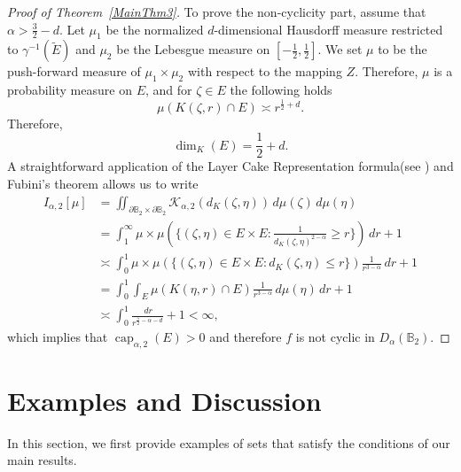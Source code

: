\documentclass[a4paper,12pt]{amsart}
\theoremstyle{definition}
\theoremstyle{remark}
\def\B{\mathbb{B}}
\begin{document}
\begin{proof} [Proof of Theorem~\ref{MainThm3}]
    To prove the non-cyclicity part, assume that $\alpha > \frac{3}{2} - d$. Let $\mu_1$ be the normalized $d$-dimensional Hausdorff measure restricted to $\gamma^{-1}(\tilde{E})$ and $\mu_2$ be the Lebesgue measure on $[-\frac{1}{2}, \frac{1}{2}]$. We set $\mu$ to be the push-forward measure of $\mu_1 \times \mu_2$ with respect to the mapping $Z$. Therefore, $\mu$ is a probability measure on $E$, and for $\zeta \in E$ the following holds
    \begin{equation*}
        \mu (K(\zeta,r) \cap E) \asymp r^{\frac{1}{2}+d}.
    \end{equation*}
    Therefore,
    \begin{equation*}
        \dim_{K}(E) = \frac{1}{2} + d.
    \end{equation*}
    A straightforward application of the Layer Cake Representation formula(see \cite[p.~26]{LiebLoss}) and Fubini's theorem allows us to write
    \begin{equation*}
    \begin{aligned}
        I_{\alpha,2}[\mu] & = \iint_{\mathbb \partial \B_2 \times \partial \B_2} \mathcal{K}_{\alpha,2}\!\left( d_K(\zeta,\eta) \right) \, d\mu(\zeta)\, d\mu(\eta) \\
        & = \int_{1}^\infty \mu \times \mu (\{ (\zeta,\eta) \in E \times E : \frac{1}{d_K(\zeta,\eta)^{2-\alpha} } \geq r \} ) \, dr + 1 \\
        & \asymp \int_{0}^1 \mu \times \mu (\{ (\zeta,\eta) \in E \times E : d_K(\zeta,\eta)  \leq r \}) \frac{1}{r^{3-\alpha}} \, dr +1 \\
        & = \int_{0}^1 \int_{E} \mu (K(\eta,r)\cap E) \frac{1}{r^{3-\alpha}} \,d\mu(\eta) \, dr +1 \\
        & \asymp \int_{0}^1 \frac{\, dr}{r^{\frac{5}{2}-\alpha - d}} + 1 < \infty,
    \end{aligned}
    \end{equation*}
    which implies that $\operatorname{cap}_{\alpha,2}(E) > 0$ and therefore $f$ is not cyclic in $D_\alpha(\B_2)$.
    \end{proof}
\section{Examples and Discussion} \label{Section6}

In this section, we first provide examples of sets that satisfy the conditions of our main results.
\end{document}
